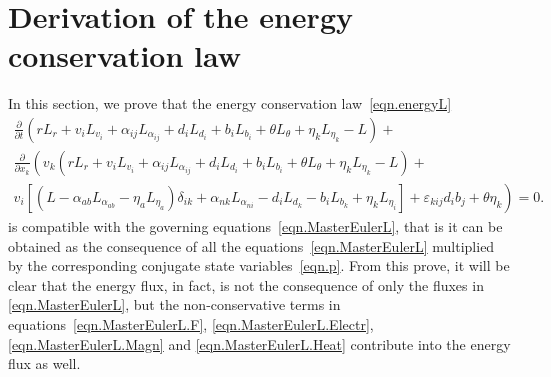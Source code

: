 \documentclass[twoside]{article}
\newcommand{\pd}{\partial}
\begin{document}
\section{Derivation of the energy conservation law}\label{sec.energycons}
In this section, we prove that the energy conservation law~\eqref{eqn.energyL}
\begin{multline*}
\frac{\pd }{\pd t}(r L_r + v_i L_{v_i} + \alpha_{ij} L_{\alpha _{ij}} + d_i 
L_{d_i} + b_i L_{b_i} + \theta L_\theta + \eta_k L_{\eta_k} - L) + \\
\frac{\pd }{\pd x_k}\left(v_k\left(r L_r + v_i L_{v_i} + \alpha_{ij} 
L_{\alpha _{ij}} + d_i L_{d_i} + b_i L_{b_i} + \theta L_\theta + \eta_k 
L_{\eta_k} - L\right) + \right.\\
\left. v_i\left[\left(L - \alpha_{ab} L_{\alpha_{ab}} - \eta_a L_{\eta_a} 
\right) \delta_{ik} + \alpha_{nk} L_{\alpha_{ni}} - d_i L_{d_k} - b_i 
L_{b_k} + \eta_k L_{\eta_i}\right] + \varepsilon_{kij} 
d_i b_j +  \theta \eta_k \right)=0.
\end{multline*}
is compatible with the governing equations~\eqref{eqn.MasterEulerL}, that 
is it can be obtained as the consequence of all the 
equations~\eqref{eqn.MasterEulerL} multiplied by the corresponding conjugate 
state variables~\eqref{eqn.p}. 
From this prove, it will be clear that the 
energy flux, in fact, is not the consequence of only the fluxes in 
\eqref{eqn.MasterEulerL}, but the non-conservative terms in 
equations~\eqref{eqn.MasterEulerL.F}, \eqref{eqn.MasterEulerL.Electr},  
\eqref{eqn.MasterEulerL.Magn} and \eqref{eqn.MasterEulerL.Heat} contribute into 
the energy flux as well.
\end{document}
